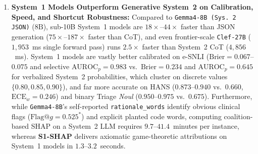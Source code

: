 \documentclass[10pt]{article}
\begin{document}
\begin{enumerate}
\item \textbf{System~1 Models Outperform Generative System~2 on Calibration, Speed, and Shortcut Robustness:} Compared to \texttt{Gemma4-8B (Sys.\,2 JSON)} ($8\text{B}$), sub-10B System~1 models are $18\times$--$44\times$ faster than JSON generation ($75\times$--$187\times$ faster than CoT), and even frontier-scale \texttt{Clef-27B} ($1{,}953$~ms single forward pass) runs $2.5\times$ faster than System~2 CoT ($4{,}856$~ms). System~1 models are vastly better calibrated on e-SNLI ($\text{Brier} = 0.067$--$0.075$ and selective $\text{AUROC}_p = 0.983$ vs.\ $\text{Brier} = 0.234$ and $\text{AUROC}_p = 0.645$ for verbalized System~2 probabilities, which cluster on discrete values $\{0.80, 0.85, 0.90\}$), and far more accurate on HANS ($0.873$--$0.940$ vs.\ $0.660$, $\text{ECE}_w = 0.246$) and binary Triage \emph{Noul} ($0.950$--$0.975$ vs.\ $0.675$). Furthermore, while \texttt{Gemma4-8B}'s self-reported \texttt{rationale\_words} identify obvious clinical flags ($\text{Flag@}g = 0.525^*$) and explicit planted code words, computing coalition-based SHAP on a System~2 LLM requires $9.7$--$41.4$~minutes per instance, whereas \textbf{S1-SHAP} delivers axiomatic game-theoretic attributions on System~1 models in $1.3$--$3.2$~seconds.
\end{enumerate}

\begin{table}[!htbp]
\centering
\caption{Cross-model comparison across System~1 decision models ($0.8\text{B}$ to $27\text{B}$, expanded $N=450$ cohort: $150$ per dataset) and generative System~2 baseline (\texttt{Gemma4-8B} JSON): clean accuracy and $\text{ECE}_w$ on e-SNLI, HANS, and Clinical Triage (\emph{Choice} head), cross-question flip rates (\emph{Choice} / \emph{Noul}), and mean word-level faithfulness/plausibility. $^*$System~2 reports self-rationalized word precision on Triage flags ($512$-coalition SHAP requires $\approx 9.7$~min/input on System~2 vs.\ $1.3$--$3.2$~s on System~1). $^\dagger$\texttt{Clef-27B} was evaluated across latency, calibration, interference, and the planted benchmark; natural-input $512$-coalition SHAP attributions are omitted due to sequential runtime ($\approx 28$~GPU hours for $100$ instances at $1.95$~s/call). Best values are in \textbf{bold}.}
\label{tab:scaling}
\resizebox{\textwidth}{!}{}
\end{table}
\end{document}
